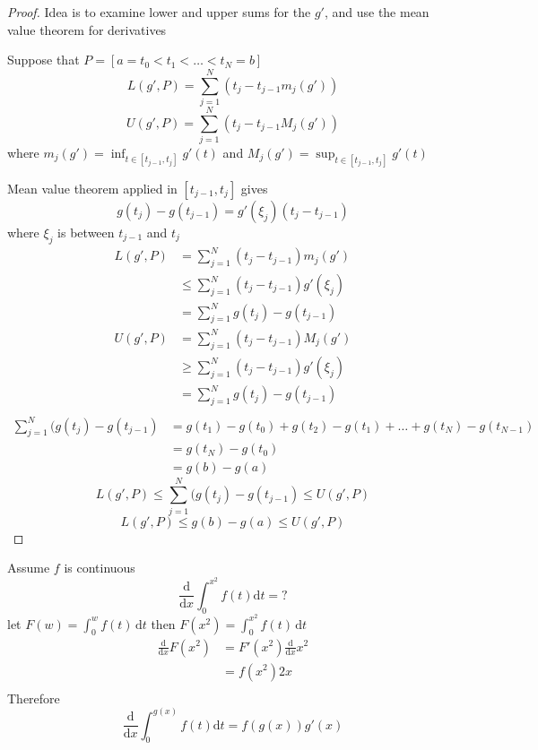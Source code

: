\begin{proof}
  Idea is to examine lower and upper sums for the $g'$, and use the mean value theorem for derivatives
  
  Suppose that $P = [a = t_0 < t_1 < \dotsc < t_N = b]$ 
  \[L(g', P) = \sum_{j=1}^N (t_j - t_{j-1}m_j(g'))\]
  \[U(g', P) = \sum_{j=1}^N (t_j - t_{j-1}M_j(g'))\]
  where $\displaystyle m_j(g') = \inf_{t \in [t_{j-1}, t_j]} g'(t)$ and $\displaystyle M_j(g') = \sup_{t \in [t_{j-1}, t_j]} g'(t)$

  Mean value theorem applied in $[t_{j-1}, t_j]$ gives $$g(t_j) - g(t_{j-1}) = g'(\xi_j)(t_j - t_{j-1})$$ where $\xi_j$ is between $t_{j-1}$ and $t_j$
  \begin{align*}
    L(g', P) &= \sum_{j=1}^N (t_j - t_{j-1})m_j(g')\\
    &\leq \sum_{j=1}^N (t_j - t_{j-1})g'(\xi_j)\\
    &= \sum_{j=1}^N g(t_j) - g(t_{j-1})\\
    U(g', P) &= \sum_{j=1}^N (t_j - t_{j-1})M_j(g')\\
    &\geq \sum_{j=1}^N (t_j - t_{j-1})g'(\xi_j)\\
    &= \sum_{j=1}^N g(t_j) - g(t_{j-1})\\
  \end{align*}
  \begin{align*}
    \sum_{j=1}^{N}(g(t_j) - g(t_{j-1}) &= g(t_1) - g(t_0) + g(t_2) - g(t_1) + \dotsc + g(t_N) - g(t_{N-1})\\
    &= g(t_N) - g(t_0)\\
    &= g(b) - g(a)
  \end{align*}
  \[L(g', P) \le \sum_{j=1}^{N}(g(t_j) - g(t_{j-1}) \le U(g', P)\]
  \[L(g', P) \le g(b) - g(a) \le U(g', P)\]
\end{proof}

\begin{example*}
  Assume $f$ is continuous
  \[\frac{\mathrm{d}}{\mathrm{d}x}\int_0^{x^2} f(t) \mathrm{d}t = ?\]
  let $\displaystyle F(w) = \int_0^w f(t)\,\mathrm{d}t$ then $\displaystyle F(x^2) = \int_0^{x^2} f(t)\,\mathrm{d}t$
  \begin{align*}
    \frac{\mathrm{d}}{\mathrm{d}x}F(x^2) &= F'(x^2) \frac{\mathrm{d}}{\mathrm{d}x}x^2\\
    &= f(x^2)2x\\
  \end{align*}
  Therefore
  \[\frac{\mathrm{d}}{\mathrm{d}x}\int_0^{g(x)} f(t) \mathrm{d}t = f(g(x))g'(x)\]
\end{example*}